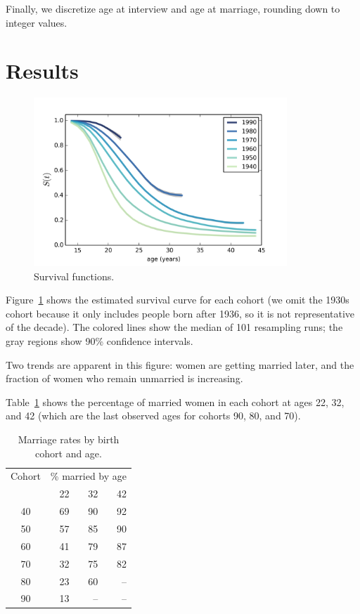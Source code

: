 \documentclass[journal]{IEEEtran}
\begin{document}
Finally, we discretize age at interview and age at marriage, rounding down
to integer values.


\section{Results}

\begin{figure}[!t]
\centering
\includegraphics[width=3.75in]{marriage2}
\caption{Survival functions.}
\label{fig:marriage2}
\end{figure}

Figure~\ref{fig:marriage2} shows the estimated survival curve for each
cohort (we omit the 1930s cohort because it only includes people born
after 1936, so it is not representative of the decade).  The colored
lines show the median of 101 resampling runs; the gray regions show
90\% confidence intervals.

Two trends are apparent in this figure: women are getting married
later, and the fraction of women who remain unmarried is increasing.

Table~\ref{tab:cohorts2} shows the percentage of married women
in each cohort at ages 22, 32, and 42 (which are the last observed
ages for cohorts 90, 80, and 70).

\begin{table}[ht]
\centering
\begin{tabular}{c|r|r|r}
Cohort & \multicolumn{3}{c}{\% married by age} \\
       & 22  & 32  & 42 \\
\hline
40 & 69 & 90 & 92 \\
50 & 57 & 85 & 90 \\
60 & 41 & 79 & 87 \\
70 & 32 & 75 & 82 \\
80 & 23 & 60 & -- \\
90 & 13 & -- & -- \\
\end{tabular}
\caption{Marriage rates by birth cohort and age.}
\label{tab:cohorts2}
\end{table}
\end{document}
